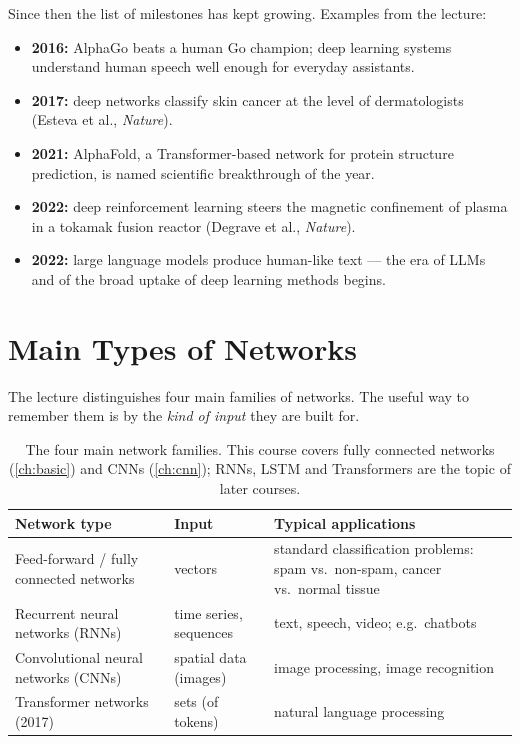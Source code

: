 \documentclass[11pt, oneside]{book}
\let\originalsection\section
\renewcommand{\section}{\Needspace{7\baselineskip}\originalsection}
\begin{document}
Since then the list of milestones has kept growing. Examples from the
lecture:
\begin{itemize}
  \item \textbf{2016:} AlphaGo beats a human Go champion; deep learning
    systems understand human speech well enough for everyday assistants.
  \item \textbf{2017:} deep networks classify skin cancer at the level of
    dermatologists (Esteva et al., \emph{Nature}).
  \item \textbf{2021:} AlphaFold, a Transformer-based network for protein
    structure prediction, is named scientific breakthrough of the year.
  \item \textbf{2022:} deep reinforcement learning steers the magnetic
    confinement of plasma in a tokamak fusion reactor (Degrave et al.,
    \emph{Nature}).
  \item \textbf{2022:} large language models produce human-like text --- the
    era of LLMs and of the broad uptake of deep learning methods begins.
\end{itemize}

\section{Main Types of Networks}
\label{sec:network-types}

The lecture distinguishes four main families of networks. The useful way to
remember them is by the \emph{kind of input} they are built for.

\begin{table}[htbp]
\centering
\small
\begin{tabular}{@{}p{4.6cm}p{2.6cm}p{5.9cm}@{}}
\toprule
\textbf{Network type} & \textbf{Input} & \textbf{Typical applications} \\
\midrule
Feed-forward / fully connected networks & vectors &
  standard classification problems: spam vs.\ non-spam, cancer vs.\ normal
  tissue \\
Recurrent neural networks (RNNs) & time series, sequences &
  text, speech, video; e.g.\ chatbots \\
Convolutional neural networks (CNNs) & spatial data (images) &
  image processing, image recognition \\
Transformer networks (2017) & sets (of tokens) &
  natural language processing \\
\bottomrule
\end{tabular}
\caption{The four main network families. This course covers fully connected
networks (\cref{ch:basic}) and CNNs (\cref{ch:cnn}); RNNs, LSTM and
Transformers are the topic of later courses.}
\label{tab:network-types}
\end{table}
\end{document}
